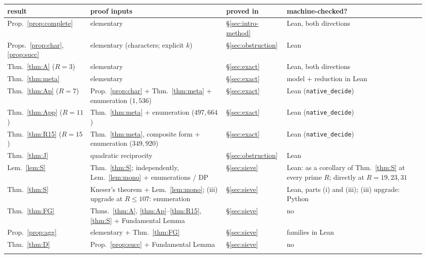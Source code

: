 \documentclass[11pt]{article}
\theoremstyle{plain}
\theoremstyle{remark}
\theoremstyle{plain}
\numberwithin{equation}{section}
\begin{document}
\begin{table}[htbp]
\centering
\small
\begin{tabular}{>{\raggedright\arraybackslash}p{2.6cm}>{\raggedright\arraybackslash}p{5.3cm}l>{\raggedright\arraybackslash}p{3.6cm}}
\toprule
result & proof inputs & proved in & machine-checked? \\ \midrule
Prop.~\ref{prop:complete} & elementary & \S\ref{sec:intro-method} & Lean, both directions \\ \addlinespace
Props.~\ref{prop:char}, \ref{prop:succ} & elementary (characters; explicit $k$) & \S\ref{sec:obstruction} & Lean \\ \addlinespace
Thm.~\ref{thm:A} ($R{=}3$) & elementary & \S\ref{sec:exact} & Lean, both directions \\ \addlinespace
Thm.~\ref{thm:meta} & elementary & \S\ref{sec:exact} & model + reduction in Lean \\ \addlinespace
Thm.~\ref{thm:Ap} ($R{=}7$) & Prop.~\ref{prop:char} + Thm.~\ref{thm:meta} + enumeration ($1{,}536$) & \S\ref{sec:exact} & Lean (\texttt{native\_decide}) \\ \addlinespace
Thm.~\ref{thm:App} ($R{=}11$) & Thm.~\ref{thm:meta} + enumeration ($497{,}664$) & \S\ref{sec:exact} & Lean (\texttt{native\_decide}) \\ \addlinespace
Thm.~\ref{thm:R15} ($R{=}15$) & Thm.~\ref{thm:meta}, composite form + enumeration ($349{,}920$) & \S\ref{sec:exact} & Lean (\texttt{native\_decide}) \\ \addlinespace
Thm.~\ref{thm:J} & quadratic reciprocity & \S\ref{sec:obstruction} & Lean \\ \addlinespace
Lem.~\ref{lem:S} & Thm.~\ref{thm:S}; independently, Lem.~\ref{lem:mono} + enumerations / DP & \S\ref{sec:sieve} & Lean: as a corollary of Thm.~\ref{thm:S} at every prime $R$; directly at $R = 19, 23, 31$ \\ \addlinespace
Thm.~\ref{thm:S} & Kneser's theorem + Lem.~\ref{lem:mono}; (iii) upgrade at $R \le 107$: enumeration & \S\ref{sec:sieve} & Lean, parts (i) and (iii); (iii) upgrade: Python \\ \addlinespace
Thm.~\ref{thm:FG} & Thms.~\ref{thm:A}, \ref{thm:Ap}--\ref{thm:R15}, \ref{thm:S} + Fundamental Lemma & \S\ref{sec:sieve} & no \\ \addlinespace
Prop.~\ref{prop:agg} & elementary + Thm.~\ref{thm:FG} & \S\ref{sec:sieve} & families in Lean \\ \addlinespace
Thm.~\ref{thm:D} & Prop.~\ref{prop:succ} + Fundamental Lemma & \S\ref{sec:sieve} & no \\ \addlinespace

\end{tabular}
\end{table}
\end{document}
